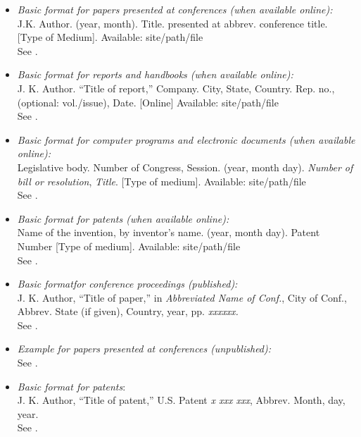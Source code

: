 \documentclass{ieeeaccess}
\begin{document}
\begin{itemize}
	\item \emph{Basic format for papers presented at conferences (when available online): }\\
	      J.K. Author. (year, month). Title. presented at abbrev. conference title. [Type of Medium]. Available: site/path/file\\
	      See \cite{b17}.

	\item \emph{Basic format for reports and handbooks (when available online):}\\
	      J. K. Author. ``Title of report,'' Company. City, State, Country. Rep. no., (optional: vol./issue), Date. [Online] Available: site/path/file\\
	      See \cite{b18,b19}.

	\item \emph{Basic format for computer programs and electronic documents (when available online): }\\
	      Legislative body. Number of Congress, Session. (year, month day). \emph{Number of bill or resolution}, \emph{Title}. [Type of medium]. Available: site/path/file\\
	      See \cite{b20}.

	\item \emph{Basic format for patents (when available online):}\\
	      Name of the invention, by inventor's name. (year, month day). Patent Number [Type of medium]. Available: site/path/file\\
	      See \cite{b21}.

	\item \emph{Basic format}\emph{for conference proceedings (published):}\\
	      J. K. Author, ``Title of paper,'' in \emph{Abbreviated Name of Conf.}, City of Conf., Abbrev. State (if given), Country, year, pp. \emph{xxxxxx.}\\
	      See \cite{b22}.

	\item \emph{Example for papers presented at conferences (unpublished):}\\
	      See \cite{b23}.

	\item \emph{Basic format for patents}$:$\\
	      J. K. Author, ``Title of patent,'' U.S. Patent \emph{x xxx xxx}, Abbrev. Month, day, year.\\
	      See \cite{b24}.


\end{itemize}
\end{document}
